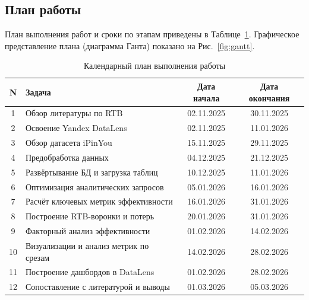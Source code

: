 \subsection{План работы}

План выполнения работ и сроки по этапам приведены в Таблице~\ref{tab:work_plan}.
Графическое представление плана (диаграмма Ганта) показано на Рис.~\ref{fig:gantt}.

\begin{table}[h!]
  \begin{center}
    \caption{Календарный план выполнения работы}
    \label{tab:work_plan}
    \renewcommand{\arraystretch}{1.15}
    \begin{tabular}{c|p{6.8cm}|c|c}
      \textbf{N} & \textbf{Задача} & \textbf{Дата начала} & \textbf{Дата окончания} \\
      \hline
      1  & Обзор литературы по RTB & 02.11.2025 & 30.11.2025 \\
      2  & Освоение Yandex DataLens & 02.11.2025 & 11.01.2026 \\
      3  & Обзор датасета iPinYou & 15.11.2025 & 29.11.2025 \\
      4  & Предобработка данных & 04.12.2025 & 21.12.2025 \\
      5  & Развёртывание БД и загрузка таблиц & 10.12.2025 & 11.01.2026 \\
      6  & Оптимизация аналитических запросов & 05.01.2026 & 16.01.2026 \\
      7  & Расчёт ключевых метрик эффективности & 16.01.2026 & 31.01.2026 \\
      8  & Построение RTB-воронки и потерь & 20.01.2026 & 31.01.2026 \\
      9  & Факторный анализ эффективности & 01.02.2026 & 14.02.2026 \\
      10 & Визуализации и анализ метрик по срезам & 14.02.2026 & 28.02.2026 \\
      11 & Построение дашбордов в DataLens & 01.02.2026 & 28.02.2026 \\
      12 & Сопоставление с литературой и выводы & 01.03.2026 & 05.03.2026 \\
    \end{tabular}
  \end{center}
\end{table}


